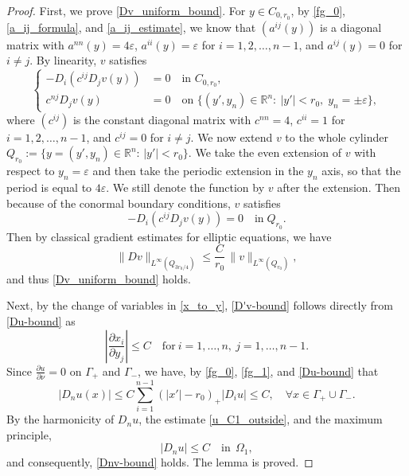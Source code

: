 \documentclass[reqno, 10pt]{amsart}
\theoremstyle{plain}
\theoremstyle{definition}
\theoremstyle{remark}
\numberwithin{equation}{section}
\begin{document}
\begin{proof}
First, we prove \eqref{Dv_uniform_bound}. For $y\in C_{0,r_0}$, by \eqref{fg_0}, \eqref{a_ij_formula}, and \eqref{a_ij_estimate}, we know that $(a^{ij}(y))$ is a diagonal matrix with $a^{nn}(y)=4\varepsilon$, $a^{ii}(y)=\varepsilon$ for $i=1,2,\ldots,n-1$, and $a^{ij}(y)=0$ for $i\neq j$. 
By linearity, $v$ satisfies \begin{equation*}%
\left\{
\begin{aligned}
-D_i(c^{ij} D_j v(y)) &=0 \quad \mbox{in } C_{0,r_0},\\
c^{nj} D_j v(y) &= 0 \quad \mbox{on } \{(y',y_n)\in \mathbb{R}^n: ~|y'|<r_0,\; y_n=\pm \varepsilon\},
\end{aligned}
\right.
\end{equation*}
where $(c^{ij})$ is the constant diagonal matrix with $c^{nn}=4$, $c^{ii}=1$ for $i=1,2,\ldots,n-1$, and $c^{ij}=0$ for $i\neq j$. 
We now extend $v$ to the whole cylinder $Q_{r_0}:=\{y=(y', y_n)\in \mathbb{R}^n: \,|y'|<r_0\}$.
We take the even extension of $v$ with respect to ${y}_n = \varepsilon$ and then take the periodic extension in the $y_n$ axis, so that the period is equal to $4\varepsilon$. We still denote the function by $v$ after the extension. Then because of the conormal boundary conditions, $v$ satisfies
\begin{equation*}%
-D_i(c^{ij} D_j v(y)) =0 \quad  \text{in} \; Q_{r_0}.
\end{equation*}
Then by classical gradient estimates for elliptic equations, we have
\begin{equation*}
    \|Dv\|_{L^\infty(Q_{3r_0/4})} \le \frac{C}{r_0}\,\|v\|_{L^\infty(Q_{r_0})},
\end{equation*}
and thus \eqref{Dv_uniform_bound} holds.

Next, by the change of variables in \eqref{x_to_y}, \eqref{D'v-bound} follows directly from \eqref{Du-bound} as
$$
\left| \frac{\partial x_i}{\partial y_j} \right| \le C \quad \mbox{for}~ i = 1,\ldots,n,~ j=1,\ldots, n-1.
$$
Since $\frac{\partial u}{\partial \nu} = 0$ on $\Gamma_+$ and $\Gamma_-$, we have, by
\eqref{fg_0}, \eqref{fg_1}, and \eqref{Du-bound} that
$$|D_n u(x)| \le  C\sum_{i = 1}^{n-1}(|x'|-r_0)_+ |D_i u|  \le C, \quad \forall x \in \Gamma_+ \cup \Gamma_-.$$
By the harmonicity of $D_n u$, the estimate \eqref{u_C1_outside}, and the maximum principle,
\begin{equation*}
|D_n u| \le C \quad \mbox{in}~~\Omega_{1},
\end{equation*}
and consequently, \eqref{Dnv-bound} holds.
The lemma is proved.
\end{proof}
\end{document}
